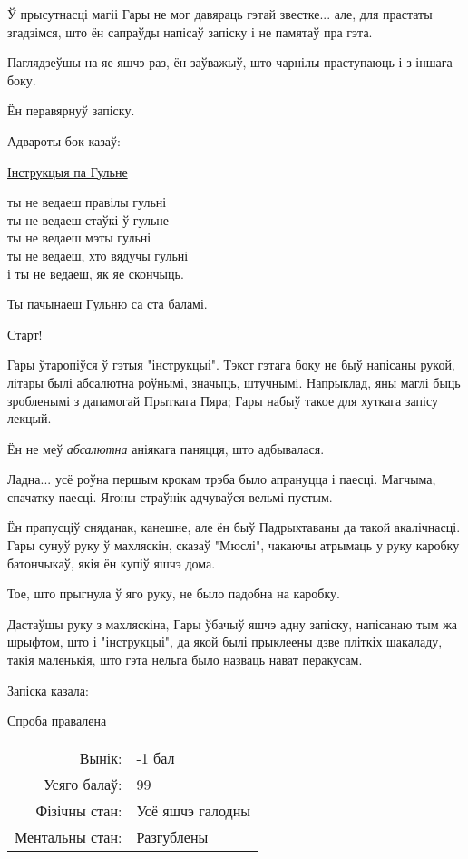 Ў прысутнасці магіі Гары не мог давяраць гэтай звестке... але, для прастаты
згадзімся, што ён сапраўды напісаў запіску і не памятаў пра гэта.

Паглядзеўшы на яе яшчэ раз, ён заўважыў, што чарнілы праступаюць і з іншага боку.

Ён перавярнуў запіску.

Адвароты бок казаў:

\begin{writtenNoteGame}
\underline{Інструкцыя па Гульне}

ты не ведаеш правілы гульні\\
ты не ведаеш стаўкі ў гульне\\
ты не ведаеш мэты гульні\\
ты не ведаеш, хто вядучы гульні\\
і ты не ведаеш, як яе скончыць.

Ты пачынаеш Гульню са ста баламі.

Старт!
\end{writtenNoteGame}

Гары ўтаропіўся ў гэтыя "інструкцыі". Тэкст гэтага боку не быў напісаны рукой, літары былі 
абсалютна роўнымі, значыць, штучнымі. Напрыклад, яны маглі быць зробленымі з
дапамогай Прыткага Пяра; Гары набыў такое для хуткага запісу лекцый.

Ён не меў \emph{абсалютна} аніякага паняцця, што адбывалася.

Ладна... усё роўна першым крокам трэба было апрануцца і паесці. Магчыма, спачатку паесці.
Ягоны страўнік адчуваўся вельмі пустым.

Ён прапусціў сняданак, канешне, але ён быў Падрыхтаваны да такой акалічнасці.
Гары сунуў руку ў махляскін, сказаў "Мюслі", чакаючы атрымаць у руку каробку
батончыкаў, якія ён купіў яшчэ дома.

Тое, што прыгнула ў яго руку, не было падобна на каробку.

Дастаўшы руку з махляскіна, Гары ўбачыў яшчэ адну запіску, напісанаю тым жа шрыфтом,
што і "інструкцыі", да якой былі прыклеены дзве пліткіх шакаладу, 
такія маленькія, што гэта нельга было назваць нават перакусам.

Запіска казала:

\begin{writtenNoteGame}
Спроба правалена
\begin{tabular}{rl}
Вынік: & -1 бал\\
Усяго балаў: & 99\\
Фізічны стан: & Усё яшчэ галодны\\
Ментальны стан: & Разгублены
\end{tabular}
\end{writtenNoteGame}

